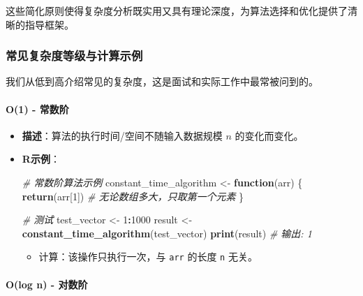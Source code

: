 \documentclass[
]{book}
\newenvironment{Shaded}{\begin{snugshade}}{\end{snugshade}}
\newcommand{\CommentTok}[1]{\textcolor[rgb]{0.56,0.35,0.01}{\textit{#1}}}
\newcommand{\ControlFlowTok}[1]{\textcolor[rgb]{0.13,0.29,0.53}{\textbf{#1}}}
\newcommand{\DecValTok}[1]{\textcolor[rgb]{0.00,0.00,0.81}{#1}}
\newcommand{\FunctionTok}[1]{\textcolor[rgb]{0.13,0.29,0.53}{\textbf{#1}}}
\newcommand{\NormalTok}[1]{#1}
\newcommand{\OtherTok}[1]{\textcolor[rgb]{0.56,0.35,0.01}{#1}}
\newcommand{\SpecialCharTok}[1]{\textcolor[rgb]{0.81,0.36,0.00}{\textbf{#1}}}
\providecommand{\tightlist}{%
  \setlength{\itemsep}{0pt}\setlength{\parskip}{0pt}}
\begin{document}
这些简化原则使得复杂度分析既实用又具有理论深度，为算法选择和优化提供了清晰的指导框架。

\hypertarget{ux5e38ux89c1ux590dux6742ux5ea6ux7b49ux7ea7ux4e0eux8ba1ux7b97ux793aux4f8b}{%
\subsubsection{常见复杂度等级与计算示例}\label{ux5e38ux89c1ux590dux6742ux5ea6ux7b49ux7ea7ux4e0eux8ba1ux7b97ux793aux4f8b}}

我们从低到高介绍常见的复杂度，这是面试和实际工作中最常被问到的。

\hypertarget{o1---ux5e38ux6570ux9636}{%
\paragraph{O(1) - 常数阶}\label{o1---ux5e38ux6570ux9636}}

\begin{itemize}
\item
  \textbf{描述}：算法的执行时间/空间不随输入数据规模 \(n\) 的变化而变化。
\item
  \textbf{R示例}：

\begin{Shaded}
\begin{Highlighting}[]
\CommentTok{\# 常数阶算法示例}
\NormalTok{constant\_time\_algorithm }\OtherTok{\textless{}{-}} \ControlFlowTok{function}\NormalTok{(arr) \{}
  \FunctionTok{return}\NormalTok{(arr[}\DecValTok{1}\NormalTok{])  }\CommentTok{\# 无论数组多大，只取第一个元素}
\NormalTok{\}}

\CommentTok{\# 测试}
\NormalTok{test\_vector }\OtherTok{\textless{}{-}} \DecValTok{1}\SpecialCharTok{:}\DecValTok{1000}
\NormalTok{result }\OtherTok{\textless{}{-}} \FunctionTok{constant\_time\_algorithm}\NormalTok{(test\_vector)}
\FunctionTok{print}\NormalTok{(result)  }\CommentTok{\# 输出: 1}
\end{Highlighting}
\end{Shaded}

  \begin{itemize}
  \tightlist
  \item
    计算：该操作只执行一次，与 \texttt{arr} 的长度 \texttt{n} 无关。
  \end{itemize}
\end{itemize}

\hypertarget{olog-n---ux5bf9ux6570ux9636}{%
\paragraph{O(log n) - 对数阶}\label{olog-n---ux5bf9ux6570ux9636}}
\end{document}
